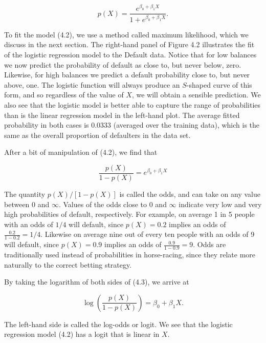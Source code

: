 \documentclass[10pt]{article}
\begin{document}
\begin{equation*}
p(X)=\frac{e^{\beta_{0}+\beta_{1} X}}{1+e^{\beta_{0}+\beta_{1} X}} . \tag{4.2}
\end{equation*}


To fit the model (4.2), we use a method called maximum likelihood, which we discuss in the next section. The right-hand panel of Figure 4.2 illustrates the fit of the logistic regression model to the Default data. Notice that for low balances we now predict the probability of default as close to, but never below, zero. Likewise, for high balances we predict a default probability close to, but never above, one. The logistic function will always produce an $S$-shaped curve of this form, and so regardless of the value of $X$, we will obtain a sensible prediction. We also see that the logistic model is better able to capture the range of probabilities than is the linear regression model in the left-hand plot. The average fitted probability in both cases is 0.0333 (averaged over the training data), which is the same as the overall proportion of defaulters in the data set.

After a bit of manipulation of (4.2), we find that


\begin{equation*}
\frac{p(X)}{1-p(X)}=e^{\beta_{0}+\beta_{1} X} \tag{4.3}
\end{equation*}


The quantity $p(X) /[1-p(X)]$ is called the odds, and can take on any value between 0 and $\infty$. Values of the odds close to 0 and $\infty$ indicate very low and very high probabilities of default, respectively. For example, on average 1 in 5 people with an odds of $1 / 4$ will default, since $p(X)=0.2$ implies an odds of $\frac{0.2}{1-0.2}=1 / 4$. Likewise on average nine out of every ten people with an odds of 9 will default, since $p(X)=0.9$ implies an odds of $\frac{0.9}{1-0.9}=9$. Odds are traditionally used instead of probabilities in horse-racing, since they relate more naturally to the correct betting strategy.

By taking the logarithm of both sides of (4.3), we arrive at


\begin{equation*}
\log \left(\frac{p(X)}{1-p(X)}\right)=\beta_{0}+\beta_{1} X . \tag{4.4}
\end{equation*}


The left-hand side is called the log-odds or logit. We see that the logistic regression model (4.2) has a logit that is linear in $X$.
\end{document}
